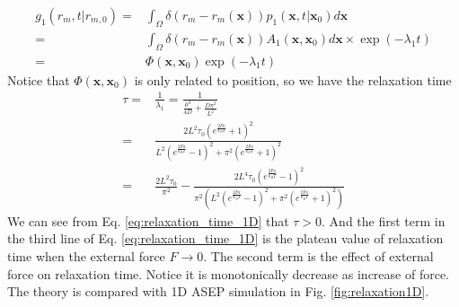 \documentclass[12pt,a4paper]{article}
\begin{document}
\begin{equation}
    \label{eq:position_relaxation}
    \begin{aligned}
        g_1(r_m,t|r_{m,0}) = & \int_{\Omega} \delta(r_m -
        r_m(\mathbf{x}))p_1(\mathbf{x}, t | \mathbf{x}_0) d\mathbf{x} \\
        = &  \int_{\Omega} \delta(r_m - r_m(\mathbf{x})) A_1(\mathbf{x},
        \mathbf{x}_0) d\mathbf{x} \times\exp(-\lambda_1 t) \\
        = & \Phi(\mathbf{x}, \mathbf{x}_0) \exp(-\lambda_1 t)
    \end{aligned}
\end{equation}
Notice that $\Phi(\mathbf{x}, \mathbf{x}_0)$ is only related to position, so we
have the relaxation time 
\begin{equation}
    \label{eq:relaxation_time_1D}
    \begin{aligned}
        \tau = & \frac{1}{\lambda_1} = \frac{1}{\frac{\mu^2}{4D} +
        \frac{D\pi^2}{L^2}} \\
    = & \frac{2 L^2 \tau_{0} \left(e^{\frac{2 F a}{k_{B} T}} + 1\right)^2}
    {L^2 \left(e^{\frac{2 F a}{k_{B}T}} - 1\right)^2 +
        \pi^2 \left(e^{\frac{2 F a}{k_{B} T}} + 1\right)^2} \\
    = &\frac{2 L^2 \tau_{0}}{\pi^2} - \frac{2 L^4 \tau_{0} \left(e^{\frac{2 F
                    a}{k_{B} T}} - 1\right)^2} {\pi^2 \left(L^2 \left(e^{\frac{2
                        F a}{k_{B} T}} - 1\right)^2 + \pi^2 \left(e^{\frac{2 F
                        a}{k_{B} T}} + 1\right)^2\right)}
    \end{aligned}
\end{equation}
We can see from Eq. \eqref{eq:relaxation_time_1D} that $\tau>0$. And the first
term in the third line of Eq. \eqref{eq:relaxation_time_1D} is the plateau value
of relaxation time when the external force $F \rightarrow 0$. The second term is
the effect of external force on relaxation time. Notice it is monotonically
decrease as increase of force. The theory is compared with 1D ASEP simulation in
Fig. \ref{fig:relaxation1D}.
\end{document}
